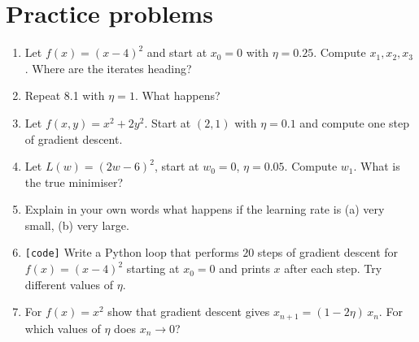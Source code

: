 \section*{Practice problems}
\begin{enumerate}[label=\textbf{\thechapter.\arabic*}]
  \item Let $f(x)=(x-4)^2$ and start at $x_0=0$ with $\eta=0.25$. Compute $x_1,x_2,x_3$. Where are the iterates heading?
  \item Repeat 8.1 with $\eta=1$. What happens?
  \item Let $f(x,y)=x^2+2y^2$. Start at $(2,1)$ with $\eta=0.1$ and compute one step of gradient descent.
  \item Let $L(w)=(2w-6)^2$, start at $w_0=0$, $\eta=0.05$. Compute $w_1$. What is the true minimiser?
  \item Explain in your own words what happens if the learning rate is (a) very small, (b) very large.
  \item[\textbf{8.6}] \texttt{[code]} Write a Python loop that performs $20$ steps of gradient descent for $f(x)=(x-4)^2$ starting at $x_0=0$ and prints $x$ after each step. Try different values of $\eta$.
  \item[\textbf{8.7}$\star$] For $f(x)=x^2$ show that gradient descent gives $x_{n+1}=(1-2\eta)\,x_n$. For which values of $\eta$ does $x_n\to0$?
\end{enumerate}

